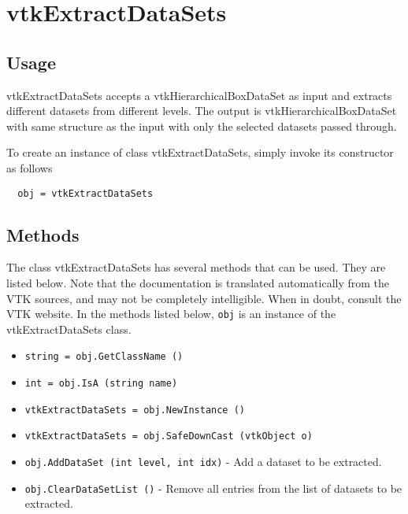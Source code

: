 \section{vtkExtractDataSets}

\subsection{Usage}

 vtkExtractDataSets accepts a vtkHierarchicalBoxDataSet as input and extracts
 different datasets from different levels. The output is
 vtkHierarchicalBoxDataSet with same structure as the input with only the
 selected datasets passed through. 

To create an instance of class vtkExtractDataSets, simply
invoke its constructor as follows
\begin{verbatim}
  obj = vtkExtractDataSets
\end{verbatim}
\subsection{Methods}

The class vtkExtractDataSets has several methods that can be used.
  They are listed below.
Note that the documentation is translated automatically from the VTK sources,
and may not be completely intelligible.  When in doubt, consult the VTK website.
In the methods listed below, \verb|obj| is an instance of the vtkExtractDataSets class.
\begin{itemize}
\item  \verb|string = obj.GetClassName ()|

\item  \verb|int = obj.IsA (string name)|

\item  \verb|vtkExtractDataSets = obj.NewInstance ()|

\item  \verb|vtkExtractDataSets = obj.SafeDownCast (vtkObject o)|

\item  \verb|obj.AddDataSet (int level, int idx)| -  Add a dataset to be extracted.

\item  \verb|obj.ClearDataSetList ()| -  Remove all entries from the list of datasets to be extracted.

\end{itemize}
